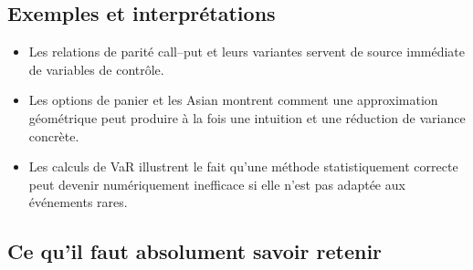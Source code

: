 \documentclass[11pt,a4paper]{article}
\begin{document}
\subsection{Exemples et interprétations}

\begin{itemize}
  \item Les relations de parité call--put et leurs variantes servent de source immédiate de variables de contrôle.
  \item Les options de panier et les Asian montrent comment une approximation géométrique peut produire à la fois une intuition et une réduction de variance concrète.
  \item Les calculs de VaR illustrent le fait qu'une méthode statistiquement correcte peut devenir numériquement inefficace si elle n'est pas adaptée aux événements rares.
\end{itemize}

\subsection{Ce qu'il faut absolument savoir retenir}
\end{document}

